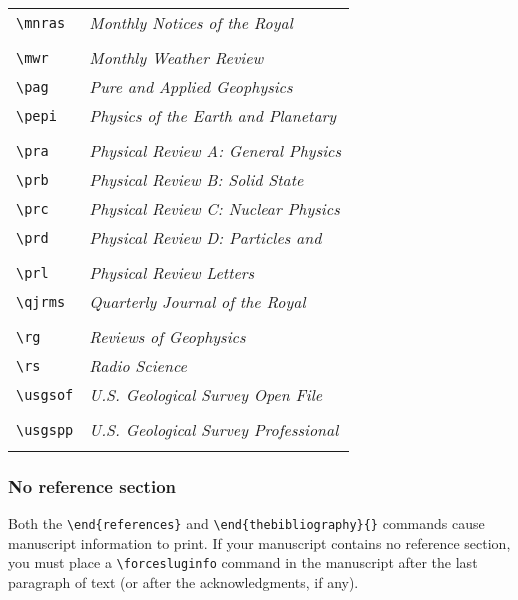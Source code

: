 \begin{article}
\begin{center}
\begin{tabular}{ll}
\verb"\mnras"  & {\it Monthly Notices of the Royal}\\
               & \hspace{2em}{\it Astronomical Society}\\
\verb"\mwr"    & {\it Monthly Weather Review}\\
\verb"\pag"    & {\it Pure and Applied Geophysics}\\
\verb"\pepi"   & {\it Physics of the Earth and Planetary}\\
               & \hspace{2em}{\it Interiors}\\
\verb"\pra"    & {\it Physical Review A: General Physics}\\
\verb"\prb"    & {\it Physical Review B: Solid State}\\
\verb"\prc"    & {\it Physical Review C: Nuclear Physics}\\
\verb"\prd"    & {\it Physical Review D: Particles and}\\
               & \hspace{2em}{\it Fields}\\
\verb"\prl"    & {\it Physical Review Letters}\\
\verb"\qjrms"  & {\it Quarterly Journal of the Royal}\\
               & \hspace{2em}{\it Meteorological Society}\\
\verb"\rg"     & {\it Reviews of Geophysics}\\
\verb"\rs"     & {\it Radio Science}\\
\verb"\usgsof" & {\it U.S. Geological Survey Open File}\\
               & \hspace{2em}{\it Report }\\
\verb"\usgspp" & {\it U.S. Geological Survey Professional}\\
               & \hspace{2em}{\it Papers}\\
\end{tabular}
\end{center}


\subsubsection{No reference section}
Both the \linebreak
\verb"\end{references}" and 
\verb"\end{thebibliography}{}" \linebreak
commands cause manuscript information to print.
If your manuscript contains no reference section, 
you must place a \verb"\forcesluginfo" command in the 
manuscript after the last paragraph of text (or 
after the acknowledgments, if any).



\end{article}
